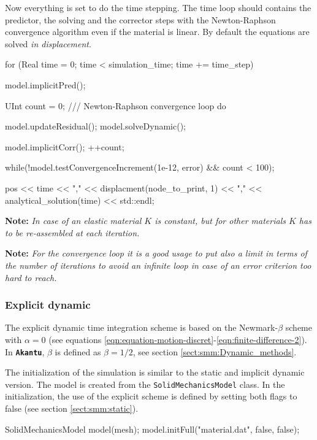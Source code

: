 \documentclass[a4paper,11pt]{book}
\newcommand{\akantu}{\texttt{\textbf{Akantu}}\xspace}
\newcommand{\code}[1]{\texttt{#1}}
\newcommand{\note}[1]{\textbf{Note: }\textit{#1}}
\begin{document}
Now everything is set to do the time stepping. The time loop should contains the
predictor,  the  solving  and   the  corrector  steps  with  the  Newton-Raphson
convergence algorithm even  if the material is linear.  By default the equations
are  solved  \emph{in  displacement}.   
\begin{cpp}
  for (Real time = 0; time < simulation_time; time += time_step) {
   model.implicitPred();

   UInt count = 0;
   /// Newton-Raphson convergence loop
   do {
     model.updateResidual();
     model.solveDynamic();

     model.implicitCorr();
     ++count;
   } while(!model.testConvergenceIncrement(1e-12, error) && count < 100);

   pos << time
       << "," << displacment(node_to_print, 1)
       << "," << analytical_solution(time) << std::endl;
 }
\end{cpp}

\note{In case  of an elastic material  $K$ is constant, but  for other materials
  $K$ has to be re-assembled at each iteration.}

\note{For the convergence loop  it is a good usage to put  also a limit in terms
  of the  number of iterations  to avoid  an infinite loop  in case of  an error
  criterion too hard to reach.}

\subsubsection{Explicit dynamic}

The explicit dynamic time integration scheme is based on the Newmark-$\beta$ 
scheme with $\alpha=0$ (see equations \ref{eqn:equation-motion-discret}-\ref{eqn:finite-difference-2}).
In \akantu, $\beta$ is defined as $\beta=1/2$, see section \ref{sect:smm:Dynamic_methods}.

The initialization of the simulation is similar to the static and implicit dynamic version. 
The model is created from the \code{SolidMechanicsModel} class. 
In the initialization, the use of the explicit scheme is defined by setting both flags 
to false (see section \ref{sect:smm:static}). 

\begin{cpp}
  SolidMechanicsModel model(mesh);
  model.initFull("material.dat", false, false);
\end{cpp}
\end{document}
